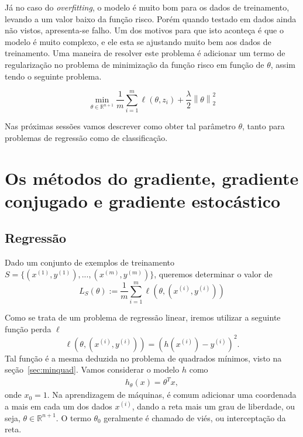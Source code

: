 \documentclass[
	12pt,				%
    oneside,			%
	a4paper,			%
	english,			%
	french,				%
	spanish,			%
	brazil,				%
	]{abntex2}
\newcommand{\norm}[1]{\left\lVert#1\right\rVert}
\begin{document}
                Já no caso do \emph{overfitting}, o modelo é muito bom para os dados de treinamento, levando a um valor baixo da função risco. Porém quando testado em dados ainda não vistos, apresenta-se falho. Um dos motivos para que isto aconteça é que o modelo é muito complexo, e ele esta se ajustando muito bem aos dados de treinamento. Uma maneira de resolver este problema é adicionar um termo de regularização no problema de minimização da função risco em função de $\theta$, assim tendo o seguinte problema.

                \begin{equation*}
                     \underset{\theta \in \mathbb{R}^{n+1}}{\min} \frac{1}{m}\sum_{i=1}^{m}\ell(\theta,z_i) +  \frac{\lambda}{2} \norm{\theta}^2_2
                \end{equation*}

                Nas próximas sessões vamos descrever como obter tal parâmetro $\theta$, tanto para problemas de regressão como de classificação.


    \section{Os métodos do gradiente, gradiente conjugado e gradiente estocástico}
        \subsection{Regressão}
            Dado um conjunto de exemplos de treinamento $S=\{(x^{(1)},y^{(1)}),...,(x^{(m)},y^{(m)})\}$, queremos determinar o valor de
            \begin{equation*}
                L_S(\theta) := \frac{1}{m}\sum_{i=1}^{m}\ell(\theta,(x^{(i)},y^{(i)}))
            \end{equation*}

            Como se trata de um problema de regressão linear, iremos utilizar a seguinte função perda $\ell$
            \begin{equation*}
                 \ell(\theta,(x^{(i)},y^{(i)})) = (h(x^{(i)}) - y^{(i)})^2.
            \end{equation*}
            Tal função é a mesma deduzida no problema de quadrados mínimos, visto na seção~\ref{sec:minquad}. Vamos considerar o modelo $h$ como
            \begin{gather*}
                h_\theta(x) = \theta^Tx,
            \end{gather*}
            onde $x_0 = 1$. Na aprendizagem de máquinas, é comum adicionar uma coordenada a mais em cada um dos dados $x^{(i)}$, dando a reta mais um grau de liberdade, ou seja, $\theta \in \mathbb{R}^{n+1}$. O termo $\theta_0$ geralmente é chamado de viés, ou interceptação da reta.
\end{document}
